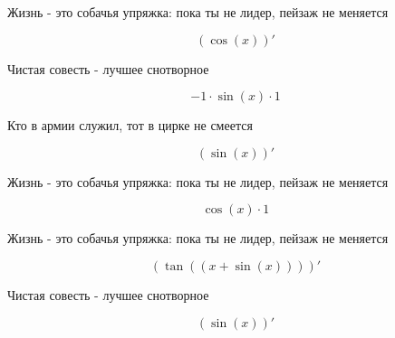 \documentclass[a4paper,12pt]{article}
\begin{document}
\begin{center}
Жизнь - это собачья упряжка: пока ты не лидер, пейзаж не меняется
\end{center}

\begin{center}
\begin{equation}
(\cos(x))'
\end{equation}
\end{center}

\begin{center}
Чистая совесть - лучшее снотворное
\end{center}

\begin{center}
\begin{equation}
-1 \cdot \sin(x) \cdot 1
\end{equation}
\end{center}

\begin{center}
Кто в армии служил, тот в цирке не смеется
\end{center}

\begin{center}
\begin{equation}
(\sin(x))'
\end{equation}
\end{center}

\begin{center}
Жизнь - это собачья упряжка: пока ты не лидер, пейзаж не меняется
\end{center}

\begin{center}
\begin{equation}
\cos(x) \cdot 1
\end{equation}
\end{center}

\begin{center}
Жизнь - это собачья упряжка: пока ты не лидер, пейзаж не меняется
\end{center}

\begin{center}
\begin{equation}
(\tan((x + \sin(x))))'
\end{equation}
\end{center}

\begin{center}
Чистая совесть - лучшее снотворное
\end{center}

\begin{center}
\begin{equation}
(\sin(x))'
\end{equation}
\end{center}
\end{document}
